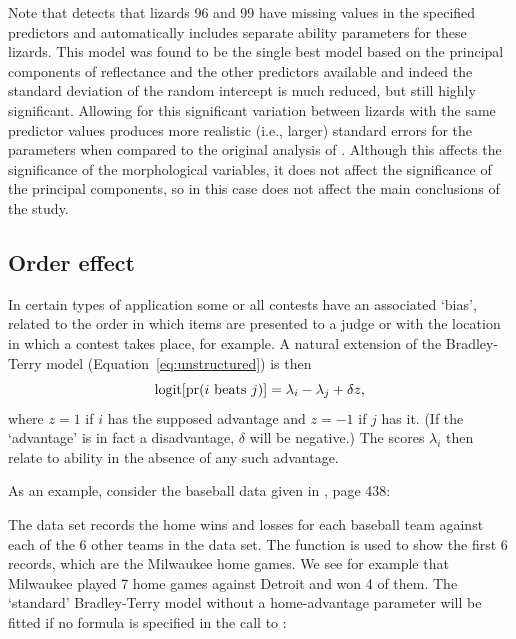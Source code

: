 \Rcodeplaceholder{}

Note that  detects that lizards 96 and 99 have missing
values in the specified predictors and automatically includes separate ability
parameters for these lizards. This model was found to be the single best model
based on the principal components of reflectance and the other predictors
available and indeed the standard deviation of the random intercept is much
reduced, but still highly significant. Allowing for this significant variation
between lizards with the same predictor values produces more realistic (i.e.,
larger) standard errors for the parameters when compared to the original
analysis of \citet{whit:06}.
Although this affects the significance of the morphological
variables, it does not affect the significance of the principal components, so
in this case does not affect the main conclusions of the study.

\subsection{Order effect}
\label{sec:order}

In certain types of application some or all contests have an associated `bias',
related to the order in which items are presented to a judge or with the
location in which a contest takes place, for example.  A natural extension of
the Bradley-Terry model (Equation~\ref{eq:unstructured}) is then
\begin{equation}
\logit[\pr(i\ \mathrm{beats}\ j)]=\lambda_i-\lambda_j + \delta z,
\end{equation}
where $z=1$ if $i$ has the supposed advantage and $z=-1$ if $j$ has it.  (If the
`advantage' is in fact a disadvantage, $\delta$ will be negative.)  The scores
$\lambda_i$ then relate to ability in the absence of any such advantage.

As an example, consider the baseball data given in \citet{agre:02}, page 438:

\Rcodeplaceholder{}

The data set records the home wins and losses for each baseball team against each
of the 6 other teams in the data set. The  function is used to
show the first 6 records, which are the Milwaukee home games. We see for
example that Milwaukee played 7 home games against Detroit and won 4 of them.
The `standard' Bradley-Terry model without a home-advantage parameter will be
fitted if no formula is specified in the call to :

